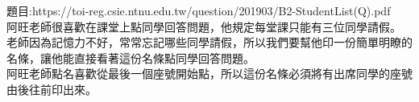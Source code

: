 題目:https://toi-reg.csie.ntnu.edu.tw/question/201903/B2-StudentList(Q).pdf\\
阿旺老師很喜歡在課堂上點同學回答問題，他規定每堂課只能有三位同學請假。\\
老師因為記憶力不好，常常忘記哪些同學請假，所以我們要幫他印一份簡單明瞭的名條，讓他能直接看著這份名條點同學回答問題。\\
 阿旺老師點名喜歡從最後一個座號開始點，所以這份名條必須將有出席同學的座號由後往前印出來。\\
